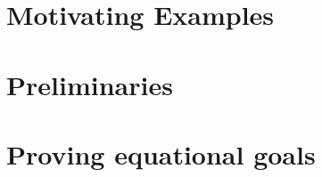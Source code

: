 \documentclass[conference]{IEEEtran}
\begin{document}
	
	
	
	
	\section{Motivating Examples}
	\label{sec:motivating}
	

	\section{Preliminaries}
	\label{sec:preliminaries}
	

	\section{Proving equational goals}
	\label{sec:equations}
	
\end{document}
